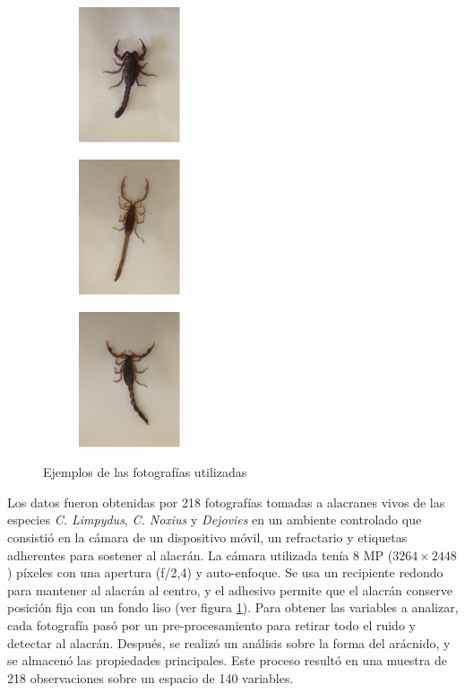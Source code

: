 \documentclass[a4paper, 10pt]{article}
\begin{document}
\begin{figure}[tb]
  \centering
  \begin{subfigure}[b]{0.3\textwidth}
    \includegraphics[width=3cm]{s1.png}
  \end{subfigure}%
  \begin{subfigure}[b]{0.3\textwidth}
    \includegraphics[width=3cm]{s2.png}
  \end{subfigure}%
  \begin{subfigure}[b]{0.3\textwidth}
    \includegraphics[width=3cm]{s3.png}
  \end{subfigure}%
  \caption{Ejemplos de las fotografías utilizadas}
  \label{fig:Alacranes}
\end{figure}

Los datos fueron obtenidas por 218 fotografías tomadas a alacranes vivos de las especies \emph{C. Limpydus}, \emph{C. Noxius} y \emph{Dejovies}  en un ambiente controlado que consistió en la cámara de un dispositivo móvil, un refractario y etiquetas adherentes para sostener al alacrán. La cámara utilizada tenía 8 MP ($3264 \times 2448$) píxeles con una apertura (f/2,4) y auto-enfoque. Se usa un recipiente redondo para mantener al alacrán al centro, y el adhesivo permite que el alacrán conserve posición fija con un fondo liso (ver figura \ref{fig:Alacranes}). Para obtener las variables a analizar, cada fotografía pasó por un pre-procesamiento para retirar todo el ruido y detectar al alacrán. Después, se realizó un análisis sobre la forma del arácnido, y se almacenó las propiedades principales. Este proceso resultó en una muestra de 218 observaciones sobre un espacio de 140 variables.
\end{document}
